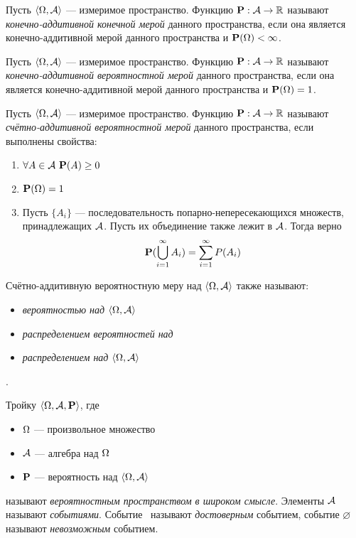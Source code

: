 \begin{definition}
	Пусть $\langle \Omega, \mathcal{A} \rangle$ --- измеримое пространство. Функцию $\mathbf{P} : \mathcal{A} \rightarrow \mathbb{R}$ называют {\it конечно-аддитивной конечной мерой} данного пространства, если она является конечно-аддитивной мерой данного пространства и $\mathbf{P} (\Omega) < \infty$.
\end{definition}

\begin{definition}
	Пусть $\langle \Omega, \mathcal{A} \rangle$ --- измеримое пространство. Функцию $\mathbf{P} : \mathcal{A} \rightarrow \mathbb{R}$ называют {\it конечно-аддитивной вероятностной мерой} данного пространства, если она является конечно-аддитивной мерой данного пространства и $\mathbf{P} (\Omega) = 1$.
\end{definition}

\begin{definition}
	Пусть $\langle \Omega, \mathcal{A} \rangle$ --- измеримое пространство. Функцию $\mathbf{P} : \mathcal{A} \rightarrow \mathbb{R}$ называют {\it счётно-аддитивной вероятностной мерой} данного пространства, если выполнены свойства:
	\begin{enumerate}
		\item $\forall A \in \mathcal{A} \ \mathbf{P}(A) \ge 0$
		\item $\mathbf{P} (\Omega) = 1$
		\item Пусть $\{A_i\}$ --- последовательность попарно-непересекающихся множеств, принадлежащих $\mathcal{A}$. Пусть их объединение также лежит в $\mathcal{A}$. Тогда верно
		$$\mathbf{P} (\bigcup_{i=1}^{\infty}A_i) = \sum_{i=1}^{\infty}P(A_i)$$
	\end{enumerate}
Счётно-аддитивную вероятностную меру над $\langle \Omega, \mathcal{A} \rangle$ также называют:
\begin{itemize}
\item {\it вероятностью над $\langle \Omega, \mathcal{A} \rangle$}
\item {\it распределением вероятностей над \oO}
\item {\it распределением над $\langle \Omega, \mathcal{A} \rangle$}
\end{itemize}.
\end{definition}

\begin{definition}
	Тройку $\langle \Omega, \mathcal{A}, \mathbf{P} \rangle$, где
	\begin{itemize}
		\item $\Omega$ --- произвольное множество
		\item $\mathcal{A}$ --- алгебра над $\Omega$
		\item $\mathbf{P}$ --- вероятность над $\langle \Omega, \mathcal{A} \rangle$
	\end{itemize}
	называют {\it вероятностным пространством в широком смысле}. Элементы $\mathcal{A}$ называют {\it событиями}. Событие \oO~называют {\it достоверным} событием, событие $\varnothing$ называют {\it невозможным} событием.
\end{definition}

